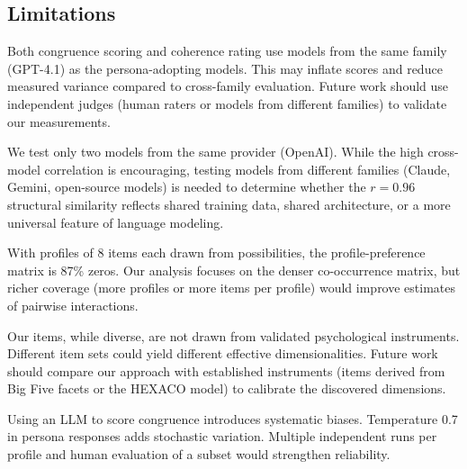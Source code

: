 \subsection{Limitations}
\label{sec:limitations}

Both congruence scoring and coherence rating use models from the same family (GPT-4.1) as the persona-adopting models.
This may inflate scores and reduce measured variance compared to cross-family evaluation.
Future work should use independent judges (\eg human raters or models from different families) to validate our measurements.

We test only two models from the same provider (OpenAI).
While the high cross-model correlation is encouraging, testing models from different families (Claude, Gemini, open-source models) is needed to determine whether the $r = 0.96$ structural similarity reflects shared training data, shared architecture, or a more universal feature of language modeling.

With \nprofiles{} profiles of 8 items each drawn from \nprefs{} possibilities, the profile-preference matrix is 87\% zeros.
Our analysis focuses on the denser co-occurrence matrix, but richer coverage (more profiles or more items per profile) would improve estimates of pairwise interactions.

Our \nprefs{} items, while diverse, are not drawn from validated psychological instruments.
Different item sets could yield different effective dimensionalities.
Future work should compare our approach with established instruments (\eg items derived from Big Five facets or the HEXACO model) to calibrate the discovered dimensions.

Using an LLM to score congruence introduces systematic biases.
Temperature 0.7 in persona responses adds stochastic variation.
Multiple independent runs per profile and human evaluation of a subset would strengthen reliability.
